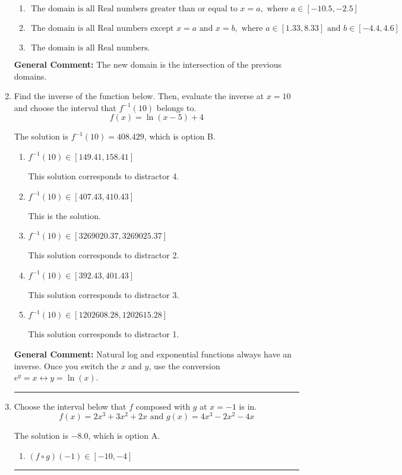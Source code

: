 \documentclass{extbook}[14pt]
\newcommand{\litem}[1]{\item #1

\rule{\textwidth}{0.4pt}}
\begin{document}
\begin{enumerate}
{\begin{enumerate}[label=\Alph*.]
\item \( \text{ The domain is all Real numbers greater than or equal to } x = a, \text{ where } a \in [-10.5, -2.5] \)


\item \( \text{ The domain is all Real numbers except } x = a \text{ and } x = b, \text{ where } a \in [1.33, 8.33] \text{ and } b \in [-4.4, 4.6] \)


\item \( \text{ The domain is all Real numbers. } \)


\end{enumerate}

\textbf{General Comment:} The new domain is the intersection of the previous domains.
}
\litem{
Find the inverse of the function below. Then, evaluate the inverse at $x = 10$ and choose the interval that $f^{-1}(10)$ belongs to.
\[ f(x) = \ln{(x-5)}+4 \]

The solution is \( f^{-1}(10) = 408.429 \), which is option B.\begin{enumerate}[label=\Alph*.]
\item \( f^{-1}(10) \in [149.41, 158.41] \)

 This solution corresponds to distractor 4.
\item \( f^{-1}(10) \in [407.43, 410.43] \)

 This is the solution.
\item \( f^{-1}(10) \in [3269020.37, 3269025.37] \)

 This solution corresponds to distractor 2.
\item \( f^{-1}(10) \in [392.43, 401.43] \)

 This solution corresponds to distractor 3.
\item \( f^{-1}(10) \in [1202608.28, 1202615.28] \)

 This solution corresponds to distractor 1.
\end{enumerate}

\textbf{General Comment:} Natural log and exponential functions always have an inverse. Once you switch the $x$ and $y$, use the conversion $ e^y = x \leftrightarrow y=\ln(x)$.
}
\litem{
Choose the interval below that $f$ composed with $g$ at $x=-1$ is in.
\[ f(x) = 2x^{3} +3 x^{2} +2 x \text{ and } g(x) = 4x^{3} -2 x^{2} -4 x \]

The solution is \( -8.0 \), which is option A.\begin{enumerate}[label=\Alph*.]
\item \( (f \circ g)(-1) \in [-10, -4] \)


\end{enumerate}}
\end{enumerate}
\end{document}
